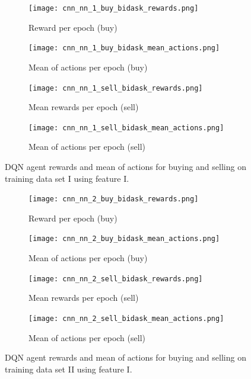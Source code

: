 \begin{figure}[H]
    \centering
    \begin{subfigure}[b]{0.4\textwidth}
        \texttt{[image: cnn\_nn\_1\_buy\_bidask\_rewards.png]}
        \caption{Reward per epoch (buy)}
        \label{fig:analysis-dqn-1-reward-buy}
    \end{subfigure}
    \begin{subfigure}[b]{0.4\textwidth}
        \texttt{[image: cnn\_nn\_1\_buy\_bidask\_mean\_actions.png]}
        \caption{Mean of actions per epoch (buy)}
        \label{fig:analysis-dqn-1-action-buy}
    \end{subfigure}
    \begin{subfigure}[b]{0.4\textwidth}
        \texttt{[image: cnn\_nn\_1\_sell\_bidask\_rewards.png]}
        \caption{Mean rewards per epoch (sell)}
        \label{fig:analysis-dqn-1-reward-sell}
    \end{subfigure}
    \begin{subfigure}[b]{0.4\textwidth}
        \texttt{[image: cnn\_nn\_1\_sell\_bidask\_mean\_actions.png]}
        \caption{Mean of actions per epoch (sell)}
        \label{fig:analysis-dqn-1-action-sell}
    \end{subfigure}
    \caption{DQN agent rewards and mean of actions for buying and selling on training data set I using feature I.}
    \label{fig:analysis-dqn-1}
\end{figure}

\begin{figure}[H]
    \centering
    \begin{subfigure}[b]{0.4\textwidth}
        \texttt{[image: cnn\_nn\_2\_buy\_bidask\_rewards.png]}
        \caption{Reward per epoch (buy)}
        \label{fig:analysis-dqn-2-reward-buy}
    \end{subfigure}
    \begin{subfigure}[b]{0.4\textwidth}
        \texttt{[image: cnn\_nn\_2\_buy\_bidask\_mean\_actions.png]}
        \caption{Mean of actions per epoch (buy)}
        \label{fig:analysis-dqn-2-action-buy}
    \end{subfigure}
    \begin{subfigure}[b]{0.4\textwidth}
        \texttt{[image: cnn\_nn\_2\_sell\_bidask\_rewards.png]}
        \caption{Mean rewards per epoch (sell)}
        \label{fig:analysis-dqn-2-reward-sell}
    \end{subfigure}
    \begin{subfigure}[b]{0.4\textwidth}
        \texttt{[image: cnn\_nn\_2\_sell\_bidask\_mean\_actions.png]}
        \caption{Mean of actions per epoch (sell)}
        \label{fig:analysis-dqn-2-action-sell}
    \end{subfigure}
    \caption{DQN agent rewards and mean of actions for buying and selling on training data set II using feature I.}
    \label{fig:analysis-dqn-2}
\end{figure}

